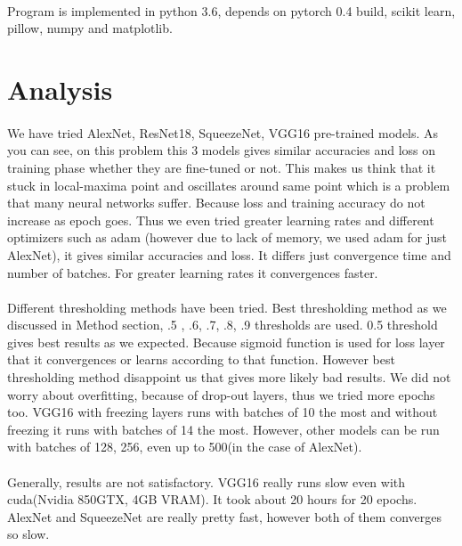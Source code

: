 \documentclass[12pt]{article}
\begin{document}
\paragraph{}Program is implemented in python 3.6, depends on pytorch 0.4 build, scikit learn, pillow, numpy and matplotlib.

\section{Analysis}
\paragraph{} We have tried AlexNet, ResNet18, SqueezeNet, VGG16 pre-trained models. As you can see, on this problem this 3 models gives similar accuracies and loss on training phase whether they are fine-tuned or not. This makes us think that it stuck in local-maxima point and oscillates around same point which is a problem that many neural networks suffer. Because loss and training accuracy do not increase as epoch goes. Thus we even tried greater learning rates and different optimizers such as adam (however due to lack of memory, we used adam for just AlexNet), it gives similar accuracies and loss. It differs just convergence time and number of batches. For greater learning rates it convergences faster.

\paragraph{}Different thresholding methods have been tried. Best thresholding method as we discussed in Method section, .5 , .6, .7, .8, .9 thresholds are used. 0.5 threshold gives best results as we expected. Because sigmoid function is used for loss layer that it convergences or learns according to that function. However best thresholding method disappoint us that gives more likely bad results. We did not worry about overfitting, because of drop-out layers, thus we tried more epochs too. VGG16 with freezing layers runs with batches of 10 the most and without freezing it runs with batches of 14 the most. However, other models can be run with batches of 128, 256, even up to 500(in the case of AlexNet).  

\paragraph{}Generally, results are not satisfactory. VGG16 really runs slow even with cuda(Nvidia 850GTX, 4GB VRAM). It took about 20 hours for 20 epochs. AlexNet and SqueezeNet are really pretty fast, however both of them converges so slow.   
\end{document}

